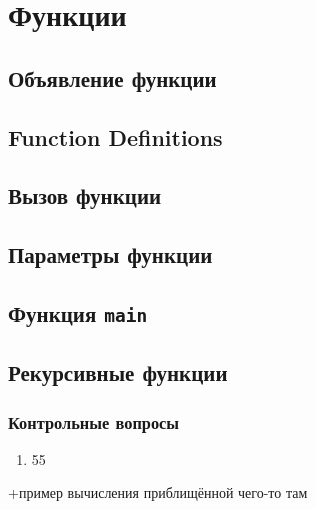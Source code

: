 \documentclass[myc.tex]{subfiles}
\begin{document}
\chapter{Функции}


\section{Объявление функции}

\section{Function Definitions}

\section{Вызов функции}

\section{Параметры функции}

\section{Функция \texttt{main}}
\label{ch:main}


\section{Рекурсивные функции}


\subsection*{Контрольные вопросы}
\begin{enumerate}
\item 55
\end{enumerate}


+пример вычисления приблищённой чего-то там
\end{document}
